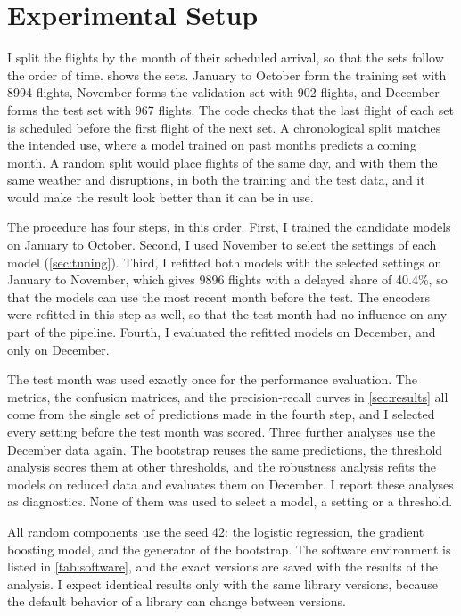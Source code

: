 \section{Experimental Setup}\label{sec:setup}

I split the flights by the month of their scheduled arrival, so that the sets follow the order of time.  shows the sets. January to October form the training set with \num{8994} flights, November forms the validation set with \num{902} flights, and December forms the test set with \num{967} flights. The code checks that the last flight of each set is scheduled before the first flight of the next set. A chronological split matches the intended use, where a model trained on past months predicts a coming month. A random split would place flights of the same day, and with them the same weather and disruptions, in both the training and the test data, and it would make the result look better than it can be in use.



The procedure has four steps, in this order. First, I trained the candidate models on January to October. Second, I used November to select the settings of each model (\cref{sec:tuning}). Third, I refitted both models with the selected settings on January to November, which gives \num{9896} flights with a delayed share of 40.4\%, so that the models can use the most recent month before the test. The encoders were refitted in this step as well, so that the test month had no influence on any part of the pipeline. Fourth, I evaluated the refitted models on December, and only on December.

The test month was used exactly once for the performance evaluation. The metrics, the confusion matrices, and the precision-recall curves in \cref{sec:results} all come from the single set of predictions made in the fourth step, and I selected every setting before the test month was scored. Three further analyses use the December data again. The bootstrap reuses the same predictions, the threshold analysis scores them at other thresholds, and the robustness analysis refits the models on reduced data and evaluates them on December. I report these analyses as diagnostics. None of them was used to select a model, a setting or a threshold.

All random components use the seed 42: the logistic regression, the gradient boosting model, and the generator of the bootstrap. The software environment is listed in \cref{tab:software}, and the exact versions are saved with the results of the analysis. I expect identical results only with the same library versions, because the default behavior of a library can change between versions.


